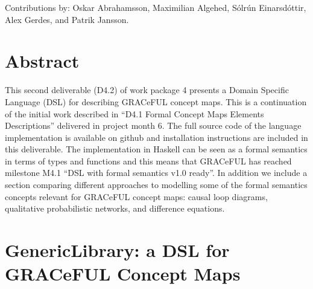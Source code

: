 \documentclass[]{article}
\begin{document}
Contributions by: Oskar Abrahamsson, Maximilian Algehed, Sólrún
Einarsdóttir, Alex Gerdes, and Patrik Jansson.

\vfill

\setcounter{tocdepth}{2}
\tableofcontents

\vfill

\newpage

\section*{Abstract}\label{abstract}

This second deliverable (D4.2) of work package 4 presents a Domain
Specific Language (DSL) for describing GRACeFUL concept maps.
%
This is a continuation of the initial work described in ``D4.1 Formal
Concept Maps Elements Descriptions'' delivered in project month 6.
%
The full source code of the language implementation is available on
github and installation instructions are included in this deliverable.
%
The implementation in Haskell can be seen as a formal semantics in
terms of types and functions and this means that GRACeFUL has reached
milestone M4.1 ``DSL with formal semantics v1.0 ready''.
%
In addition we include a section comparing different approaches to
modelling some of the formal semantics concepts relevant for GRACeFUL
concept maps: causal loop diagrams, qualitative probabilistic
networks, and difference equations.





\section{GenericLibrary: a DSL for GRACeFUL Concept Maps}
\label{sec:gl}





\end{document}
